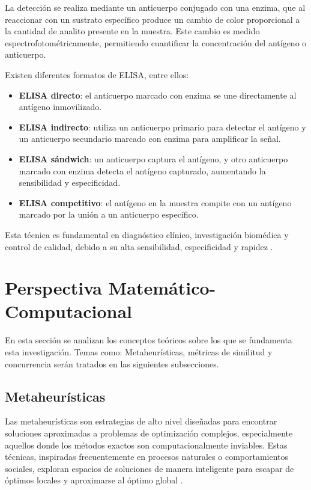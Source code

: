La detección se realiza mediante un anticuerpo conjugado con una enzima, que al reaccionar con un sustrato específico produce un cambio de color proporcional a la cantidad de analito presente en la muestra. Este cambio es medido espectrofotométricamente, permitiendo cuantificar la concentración del antígeno o anticuerpo.

Existen diferentes formatos de ELISA, entre ellos:

\begin{itemize}
    \item \textbf{ELISA directo}: el anticuerpo marcado con enzima se une directamente al antígeno inmovilizado.
    \item \textbf{ELISA indirecto}: utiliza un anticuerpo primario para detectar el antígeno y un anticuerpo secundario marcado con enzima para amplificar la señal.
    \item \textbf{ELISA sándwich}: un anticuerpo captura el antígeno, y otro anticuerpo marcado con enzima detecta el antígeno capturado, aumentando la sensibilidad y especificidad.
    \item \textbf{ELISA competitivo}: el antígeno en la muestra compite con un antígeno marcado por la unión a un anticuerpo específico.
\end{itemize}

Esta técnica es fundamental en diagnóstico clínico, investigación biomédica y control de calidad, debido a su alta sensibilidad, especificidad y rapidez \cite{Lequin2005}.

\section{Perspectiva Matemático-Computacional}
En esta sección se analizan los conceptos teóricos sobre los que se fundamenta esta investigación. Temas como: Metaheurísticas, métricas de similitud y concurrencia serán tratados en las siguientes subsecciones.


\subsection{Metaheurísticas}
\label{sec:metaheuristicas}

Las metaheurísticas son estrategias de alto nivel diseñadas para encontrar soluciones aproximadas a problemas de optimización complejos, especialmente aquellos donde los métodos exactos son computacionalmente inviables. Estas técnicas, inspiradas frecuentemente en procesos naturales o comportamientos sociales, exploran espacios de soluciones de manera inteligente para escapar de óptimos locales y aproximarse al óptimo global \cite{Talbi2009}.

